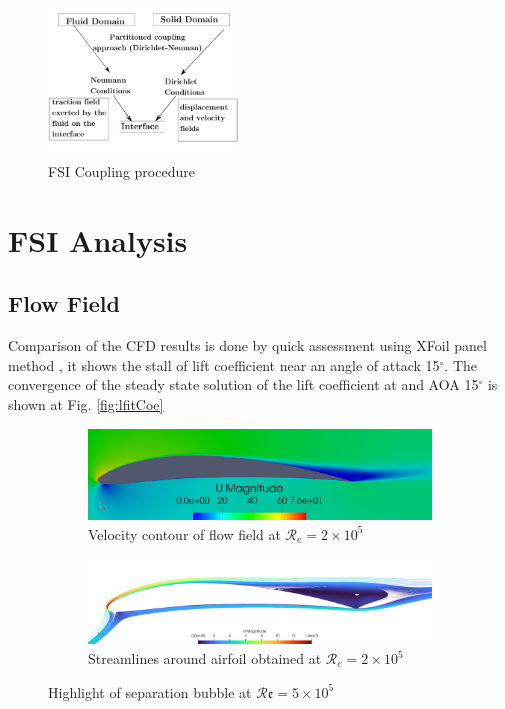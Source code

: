 \documentclass[conf]{new-aiaa}
\newcommand{\Rey}{\mathcal{R}\mathfrak{e}}
\begin{document}
\begin{figure}[ht!]
\centering
\includegraphics[width=0.45\textwidth]{Figures/FSI.pdf}
\caption{FSI Coupling procedure}
\label{fig:airfoilSegments} 
\end{figure}

\section{FSI Analysis}
\label{sec:results}
\subsection{Flow Field}
\label{sec:flowField}
Comparison of the CFD results is done by quick assessment using XFoil panel method \cite{Drela1987}, it shows the stall of lift coefficient near an angle of attack 15$^\circ$.
%
The convergence of the steady state solution of the lift coefficient  at and AOA 15$^\circ$ is shown at Fig. \ref{fig:lfitCoe}
%
\begin{figure}[ht!]
\centering
\begin{subfigure}{.45\textwidth}
\includegraphics[width=0.99\columnwidth]{Figures/VelocityContour.png}
\caption{Velocity contour of flow field at $\mathcal{R}_e=2\times10^5$}
\label{fig:velocitycontour}
\end{subfigure}
\begin{subfigure}{.45\textwidth}
\includegraphics[width=0.99\columnwidth]{figs/velocityContours2.png}
\caption{Streamlines around airfoil obtained at $\mathcal{R}_e=2\times10^5$}
\label{fig:streamlines}
\end{subfigure}
\caption{\label{fig:history} Highlight of separation bubble at $\Rey =5\times10^5$ }
\label{fig:history}
\end{figure}
\end{document}
